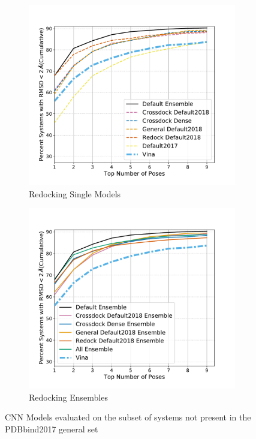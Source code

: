 \documentclass[journal=jcisd8,manuscript=article]{achemso}
\begin{document}
\begin{figure}    
        \begin{subfigure}[b]{0.48\textwidth}    
    		\centering
    		\includegraphics[width=\textwidth]{figures/redocking/single_models_no2017_line.pdf}
    		\caption{Redocking Single Models}
    		\label{fig:No2017SingleRD}
        \end{subfigure}    
        \begin{subfigure}[b]{0.48\textwidth}    
    		\centering
    		\includegraphics[width=\textwidth]{figures/redocking/ensemble_models_no2017_line.pdf}
    		\caption{Redocking Ensembles}
    		\label{fig:No2017EnsRD}
        \end{subfigure}    
	\caption{CNN Models evaluated on the subset of systems not present in the PDBbind2017 general set}
	\label{fig:No2017}
\end{figure}
\end{document}
